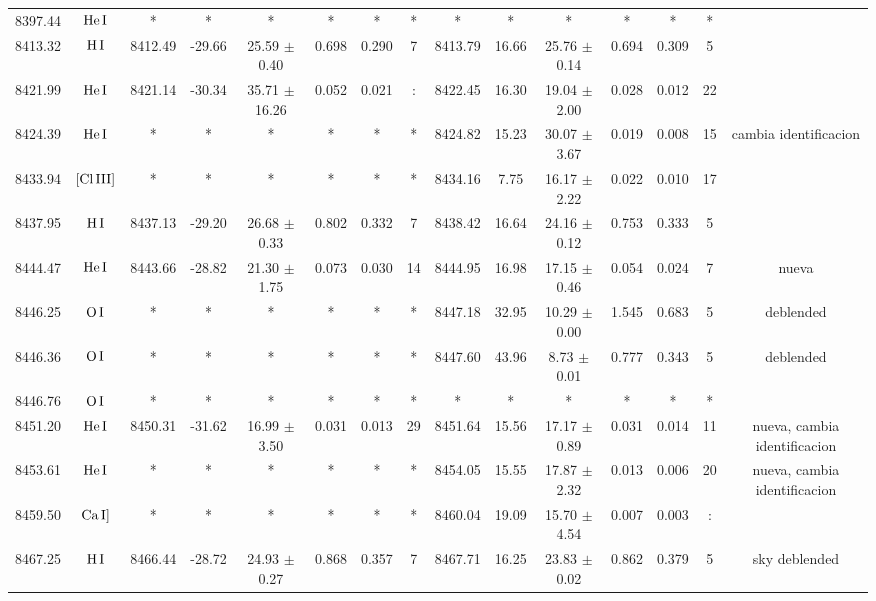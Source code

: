 \documentclass{article}
\begin{document}
\begin{table*}
\begin{adjustbox}{width=\textwidth}
\begin{tabular}{ccccccccccccccc}
8397.44 & $\mbox{He}\thinspace \mbox{I}$ & * & * & * & * & * & * & * & * & * & * & * & * &  \\
8413.32 & $\mbox{H}\thinspace \mbox{I}$ & 8412.49 & -29.66 & 25.59 $\pm$ 0.40 & 0.698 & 0.290 & 7 & 8413.79 & 16.66 & 25.76 $\pm$ 0.14 & 0.694 & 0.309 & 5 &  \\
8421.99 & $\mbox{He}\thinspace \mbox{I}$ & 8421.14 & -30.34 & 35.71 $\pm$ 16.26 & 0.052 & 0.021 & : & 8422.45 & 16.30 & 19.04 $\pm$ 2.00 & 0.028 & 0.012 & 22 &  \\
8424.39 & $\mbox{He}\thinspace \mbox{I}$ & * & * & * & * & * & * & 8424.82 & 15.23 & 30.07 $\pm$ 3.67 & 0.019 & 0.008 & 15 &  cambia identificacion \\
8433.94 & $\mbox{[Cl}\thinspace \mbox{III]}$ & * & * & * & * & * & * & 8434.16 & 7.75 & 16.17 $\pm$ 2.22 & 0.022 & 0.010 & 17 &  \\
8437.95 & $\mbox{H}\thinspace \mbox{I}$ & 8437.13 & -29.20 & 26.68 $\pm$ 0.33 & 0.802 & 0.332 & 7 & 8438.42 & 16.64 & 24.16 $\pm$ 0.12 & 0.753 & 0.333 & 5 &  \\
8444.47 & $\mbox{He}\thinspace \mbox{I}$ & 8443.66 & -28.82 & 21.30 $\pm$ 1.75 & 0.073 & 0.030 & 14 & 8444.95 & 16.98 & 17.15 $\pm$ 0.46 & 0.054 & 0.024 & 7 &  nueva \\
8446.25 & $\mbox{O}\thinspace \mbox{I}$ & * & * & * & * & * & * & 8447.18 & 32.95 & 10.29 $\pm$ 0.00 & 1.545 & 0.683 & 5 &  deblended \\
8446.36 & $\mbox{O}\thinspace \mbox{I}$ & * & * & * & * & * & * & 8447.60 & 43.96 & 8.73 $\pm$ 0.01 & 0.777 & 0.343 & 5 &  deblended \\
8446.76 & $\mbox{O}\thinspace \mbox{I}$ & * & * & * & * & * & * & * & * & * & * & * & * &  \\
8451.20 & $\mbox{He}\thinspace \mbox{I}$ & 8450.31 & -31.62 & 16.99 $\pm$ 3.50 & 0.031 & 0.013 & 29 & 8451.64 & 15.56 & 17.17 $\pm$ 0.89 & 0.031 & 0.014 & 11 &  nueva, cambia identificacion \\
8453.61 & $\mbox{He}\thinspace \mbox{I}$ & * & * & * & * & * & * & 8454.05 & 15.55 & 17.87 $\pm$ 2.32 & 0.013 & 0.006 & 20 &  nueva, cambia identificacion \\
8459.50 & $\mbox{Ca}\thinspace \mbox{I]}$ & * & * & * & * & * & * & 8460.04 & 19.09 & 15.70 $\pm$ 4.54 & 0.007 & 0.003 & : &  \\
8467.25 & $\mbox{H}\thinspace \mbox{I}$ & 8466.44 & -28.72 & 24.93 $\pm$ 0.27 & 0.868 & 0.357 & 7 & 8467.71 & 16.25 & 23.83 $\pm$ 0.02 & 0.862 & 0.379 & 5 &  sky deblended \\

\end{tabular}
\end{adjustbox}
\end{table*}
\end{document}
